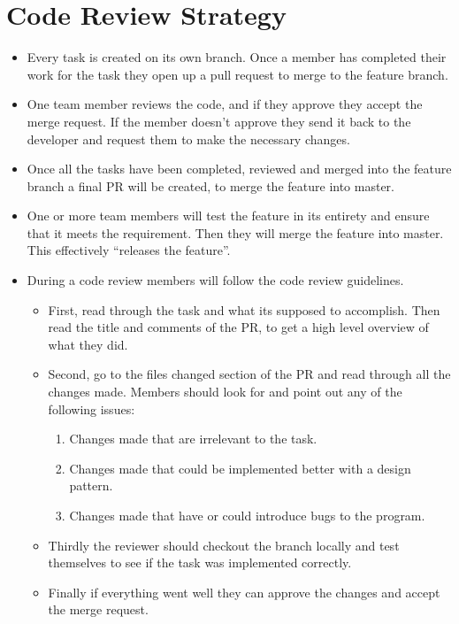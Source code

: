 \documentclass[12pt]{article}
\begin{document}
\section{Code Review Strategy}
\begin{itemize}%
\item Every task is created on its own branch. Once a member has completed their work for the task they open up a pull request to merge to the feature branch. 
\item One team member reviews the code, and if they approve they accept the merge request. If the member doesn’t approve they send it back to the developer and request them to make the necessary changes. 
\item Once all the tasks have been completed, reviewed and merged into the feature branch a final PR will be created, to merge the feature into master. 
\item One or more team members will test the feature in its entirety and ensure that it meets the requirement. Then they will merge the feature into master. This effectively “releases the feature”.
\item During a code review members will follow the code review guidelines. 
\begin{itemize}
\item First, read through the task and what its supposed to accomplish. Then read the title and comments of the PR, to get a high level overview of what they did.
\item Second, go to the files changed section of the PR and read through all the changes made. Members should look for and point out any of the following issues: 
\begin{enumerate}
\item Changes made that are irrelevant to the task. 
\item Changes made that could be implemented better with a design pattern.
\item Changes made that have or could introduce bugs to the program.
\end{enumerate}
\item Thirdly the reviewer should checkout the branch locally and test themselves to see if the task was implemented correctly.
\item Finally if everything went well they can approve the changes and accept the merge request.
\end{itemize}
 \end{itemize}

\pagebreak
\end{document}
